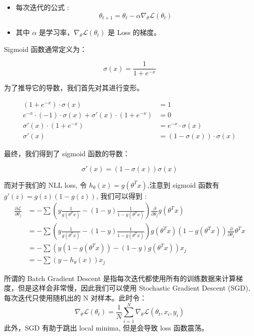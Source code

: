 \begin{definition}
    \begin{itemize}
        \item 每次迭代的公式 :
        $$\theta_{t+1} = \theta_t - \alpha \nabla_{\theta} \mathcal{L}(\theta_t)$$
        \item 其中 $\alpha$ 是学习率，$\nabla_{\theta} \mathcal{L}(\theta_t)$ 是 Loss 的梯度。
    \end{itemize}
\end{definition}

Sigmoid 函数通常定义为：

$$
\sigma(x) = \frac{1}{1 + e^{-x}}
$$

为了推导它的导数，我们首先对其进行变形。

$$
\begin{aligned}
(1 + e^{-x})·\sigma(x) &= 1\\
e^{-x}·(-1)·\sigma(x) + \sigma'(x)·(1 + e^{-x}) &=0\\
\sigma'(x)·(1 + e^{-x}) &= e^{-x}·\sigma(x)\\
\sigma'(x)&=(1-\sigma(x))·\sigma(x)
\end{aligned}
$$

最终，我们得到了 sigmoid 函数的导数：

$$
\sigma'(x) = (1-\sigma(x))\sigma(x)
$$

\begin{note}
而对于我们的 NLL loss, 令 $h_\theta(x) = g(\theta^T x)$,注意到 sigmoid 函数有 $g'(z) = g(z)(1-g(z))$, 我们可以得到 :
$$\begin{aligned}\frac{\partial\mathcal{L}}{\partial\theta_{j}}&=-\sum\left(y\frac1{g(\theta^Tx)}-(1-y)\frac1{1-g(\theta^Tx)}\right)\frac\partial{\partial\theta_j}g(\theta^Tx)\\&=-\sum\left(y\frac1{g(\theta^Tx)}-(1-y)\frac1{1-g(\theta^Tx)}\right)g(\theta^Tx)(1-g(\theta^Tx))\frac\partial{\partial\theta_j}\theta^Tx\\&=-\sum\left(y(1-g(\theta^Tx))-(1-y)g(\theta^Tx)\right)x_j\\&=-\sum\left(y-h_\theta(x)\right)x_j\end{aligned}
$$
\end{note}
\begin{theorem}
    所谓的 Batch Gradient Descent 是指每次迭代都使用所有的训练数据来计算梯度，但是这样会非常慢，因此我们可以使用 Stochastic Gradient Descent (SGD), 每次迭代只使用随机出的 N 对样本。此时令：
    $$\nabla_{\theta} \mathcal{L}(\theta_t) = \frac{1}{N}\sum_{i=1}^N \nabla_{\theta} \mathcal{L}(\theta_t, x_i, y_i)$$
    此外，SGD 有助于跳出 local minima, 但是会导致 loss 函数震荡。
\end{theorem}

